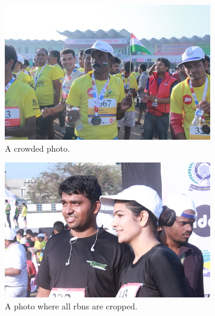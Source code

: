 \begin{figure}[th]
  \centering
  \begin{subfigure}[b]{0.4\textwidth}
    \includegraphics[width=\textwidth]{images/dataset/ImageFeatures_Crowded}
    \caption{\footnotesize A crowded photo.}
    \label{fig:dataset:image_features:crowded}
  \end{subfigure}
  \hspace{0.05\textwidth}
  \begin{subfigure}[b]{0.4\textwidth}
    \includegraphics[width=\textwidth]{images/dataset/ImageFeatures_Optional_RBNsCropped}
    \caption{\footnotesize A photo where all \glspl{rbn} are cropped.}
    \label{fig:dataset:image_features:rbns_cropped}
  \end{subfigure}\\
  \vspace{1cm}
  \begin{subfigure}[b]{0.4\textwidth}

\end{subfigure}
\end{figure}
